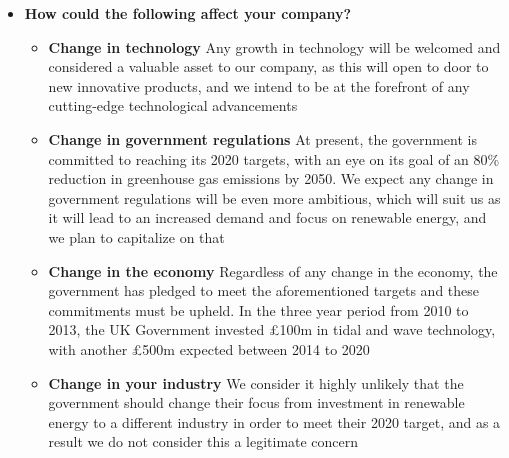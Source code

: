 \documentclass[a4paper,11pt]{article}
\begin{document}
\begin{itemize}
	\item \textbf{How could the following affect your company?}
	
	\begin{itemize}
		\item \textbf{Change in technology} Any growth in technology will be welcomed and considered a valuable asset to our company, as this will open to door to new innovative products, and we intend to be at the forefront of any cutting-edge technological advancements
		
		\item \textbf{Change in government regulations} At present, the government is committed to reaching its 2020 targets, with an eye on its goal of an 80\% reduction in greenhouse gas emissions by 2050\cite{f9}. We expect any change in government regulations will be even more ambitious, which will suit us as it will lead to an increased demand and focus on renewable energy, and we plan to capitalize on that
		
		\item \textbf{Change in the economy} Regardless of any change in the economy, the government has pledged to meet the aforementioned targets and these commitments must be upheld. In the three year period from 2010 to 2013, the UK Government invested £100m in tidal and wave technology, with another £500m expected between 2014 to 2020\cite{f10}
		
		\item \textbf{Change in your industry} We consider it highly unlikely that the government should change their focus from investment in renewable energy to a different industry in order to meet their 2020 target, and as a result we do not consider this a legitimate concern
	\end{itemize}
\end{itemize}
\end{document}
